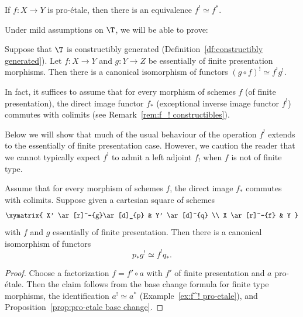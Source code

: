 \begin{ex}\label{ex:f^! pro-etale}
If $f : X \to Y$ is pro-étale, then there is an equivalence $f^! \simeq f^*$.
\end{ex}

Under mild assumptions on $\T$, we will be able to prove:

\begin{prop}\label{prop:f^! efp compose}
Suppose that $\T$ is constructibly generated (Definition~\ref{df:constructibly generated}).
Let $f : X \to Y$ and $g : Y \to Z$ be essentially of finite presentation morphisms.
Then there is a canonical isomorphism of functors $(g\circ f)^! \simeq f^!g^!$.
\end{prop}

In fact, it suffices to assume that for every morphism of schemes $f$ (\resp of finite presentation), the direct image functor $f_*$ (\resp exceptional inverse image functor $f^!$) commutes with colimits (see Remark~\ref{rem:f_! constructibles}).

\begin{warn}\label{warn:f_! efp}
Below we will show that much of the usual behaviour of the operation $f^!$ extends to the essentially of finite presentation case.
However, we caution the reader that we cannot typically expect $f^!$ to admit a left adjoint $f_!$ when $f$ is not of finite type.
\end{warn}

\begin{prop}\label{prop:base change efp}
Assume that for every morphism of schemes $f$, the direct image $f_*$ commutes with colimits.
Suppose given a cartesian square of schemes
\[
\xymatrix{
X' \ar[r]^-{g}\ar[d]_{p}
& Y' \ar[d]^{q}
\\
X \ar[r]^-{f}
& Y
}
\]
with $f$ and $g$ essentially of finite presentation.
Then there is a canonical isomorphism of functors
\[
p_*g^! \simeq f^!q_*.
\]
\end{prop}
\begin{proof}
Choose a factorization $f = f' \circ a$ with $f'$ of finite presentation and $a$ pro-étale.
Then the claim follows from the base change formula for finite type morphisms, the identification $a^! \simeq a^*$ (Example~\ref{ex:f^! pro-etale}), and Proposition~\ref{prop:pro-etale base change}.
\end{proof}

